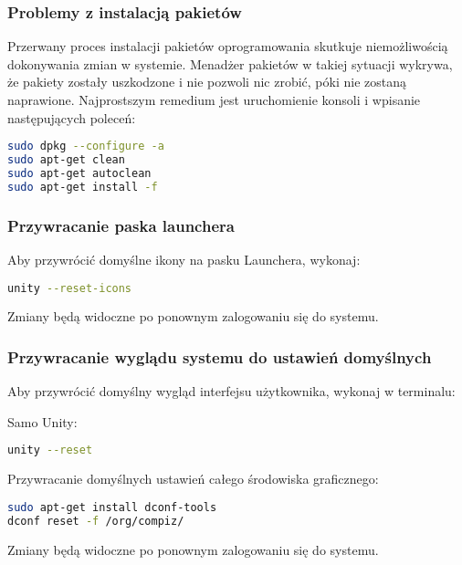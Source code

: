 \subsubsection{Problemy z instalacją pakietów}
Przerwany proces instalacji pakietów oprogramowania skutkuje niemożliwością dokonywania zmian w systemie. Menadżer pakietów w takiej sytuacji wykrywa, że pakiety zostały uszkodzone i nie pozwoli nic zrobić, póki nie zostaną naprawione. Najprostszym remedium jest uruchomienie konsoli  i wpisanie następujących poleceń:

\begin{lstlisting}[language=bash]
sudo dpkg --configure -a
sudo apt-get clean
sudo apt-get autoclean
sudo apt-get install -f
\end{lstlisting}

\subsubsection{Przywracanie paska launchera}
Aby przywrócić domyślne ikony na pasku Launchera, wykonaj:

\begin{lstlisting}[language=bash]
unity --reset-icons
\end{lstlisting}

Zmiany będą widoczne po ponownym zalogowaniu się do systemu.

\subsubsection{Przywracanie wyglądu systemu do ustawień domyślnych}
\label{unity_reset} \noindent Aby przywrócić domyślny wygląd interfejsu użytkownika, wykonaj w terminalu:

\noindent Samo Unity:
\begin{lstlisting}[language=bash]
unity --reset
\end{lstlisting}

\noindent Przywracanie domyślnych ustawień całego środowiska graficznego:

\begin{lstlisting}[language=bash]
sudo apt-get install dconf-tools
dconf reset -f /org/compiz/
\end{lstlisting}

\noindent Zmiany będą widoczne po ponownym zalogowaniu się do systemu.
\clearpage
